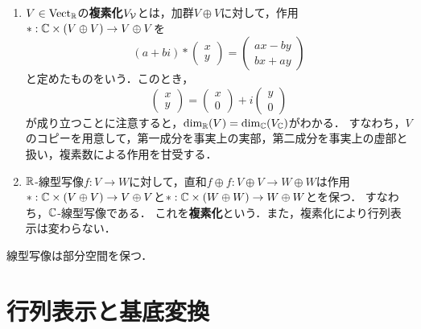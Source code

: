 \documentclass[uplatex,dvipdfmx]{jsreport}
\begin{document}
\begin{example}[複素化]\mbox{}
    \begin{enumerate}
        \item $V\in\mathrm{Vect}_{\mathbb{R}}$の\textbf{複素化}$V_{\mathcal{V}}$とは，加群$V\oplus V$に対して，作用$*:\mathbb{C}\times (V\oplus V)\to V\oplus V$を
        \[(a+bi)*\begin{pmatrix}x\\y\end{pmatrix}=\begin{pmatrix}ax-by\\bx+ay\end{pmatrix}\]
        と定めたものをいう．このとき，
        \[\begin{pmatrix}x\\y\end{pmatrix}=\begin{pmatrix}x\\0\end{pmatrix}+i\begin{pmatrix}
            y\\0
        \end{pmatrix}\]
        が成り立つことに注意すると，$\dim_{\mathbb{R}}(V)=\dim_{\mathbb{C}}(V_{\mathbb{C}})$がわかる．
        すなわち，$V$のコピーを用意して，第一成分を事実上の実部，第二成分を事実上の虚部と扱い，複素数による作用を甘受する．
        \item $\mathbb{R}$-線型写像$f:V\to W$に対して，直和$f\oplus f:V\oplus V\to W\oplus W$は作用$*:\mathbb{C}\times (V\oplus V)\to V\oplus V$と$*:\mathbb{C}\times(W\oplus W)\to W\oplus W$とを保つ．
        すなわち，$\mathbb{C}$-線型写像である．
        これを\textbf{複素化}という．また，複素化により行列表示は変わらない．
    \end{enumerate}
\end{example}

\begin{definition}
    線型写像は部分空間を保つ．
\end{definition}

\section{行列表示と基底変換}
\end{document}
